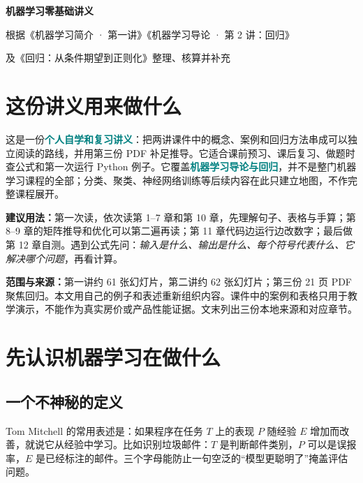 \documentclass[UTF8,11pt,oneside]{ctexbook}
\newcommand{\key}[1]{\textcolor{teal}{\bfseries #1}}
\begin{document}
\hypersetup{pageanchor=false}
\begin{titlepage}
\centering\vspace*{4cm}
{\Huge\bfseries\color{navy}机器学习零基础讲义\par}
\vspace{0.8cm}{\LARGE 导论与回归\par}
\vspace{1.6cm}{\large 面向没有机器学习基础、Python 基础一般的自学者\par}
\vfill
{\large 根据《机器学习简介 · 第一讲》《机器学习导论 · 第 2 讲：回归》\par
及《回归：从条件期望到正则化》整理、核算并补充\par}
\vspace{1cm}{\large 个人学习使用 · 2026 年 9 月\par}
\end{titlepage}
\hypersetup{pageanchor=true}
\frontmatter

\chapter*{这份讲义用来做什么}
这是一份\key{个人自学和复习讲义}：把两讲课件中的概念、案例和回归方法串成可以独立阅读的路线，并用第三份 PDF 补足推导。它适合课前预习、课后复习、做题时查公式和第一次运行 Python 例子。它覆盖\key{机器学习导论与回归}，并不是整门机器学习课程的全部；分类、聚类、神经网络训练等后续内容在此只建立地图，不作完整课程展开。

\textbf{建议用法：}第一次读，依次读第 1--7 章和第 10 章，先理解句子、表格与手算；第 8--9 章的矩阵推导和优化可以第二遍再读；第 11 章代码边运行边改数字；最后做第 12 章自测。遇到公式先问：\emph{输入是什么、输出是什么、每个符号代表什么、它解决哪个问题}，再看计算。

\textbf{范围与来源：}第一讲约 61 张幻灯片，第二讲约 62 张幻灯片；第三份 21 页 PDF 聚焦回归。本文用自己的例子和表述重新组织内容。课件中的案例和表格只用于教学演示，不能作为真实房价或产品性能证据。文末列出三份本地来源和对应章节。

\tableofcontents
\mainmatter

\chapter{先认识机器学习在做什么}
\section{一个不神秘的定义}
Tom Mitchell 的常用表述是：如果程序在任务 $T$ 上的表现 $P$ 随经验 $E$ 增加而改善，就说它从经验中学习。比如识别垃圾邮件：$T$ 是判断邮件类别，$P$ 可以是误报率，$E$ 是已经标注的邮件。三个字母能防止一句空泛的“模型更聪明了”掩盖评估问题。
\end{document}
